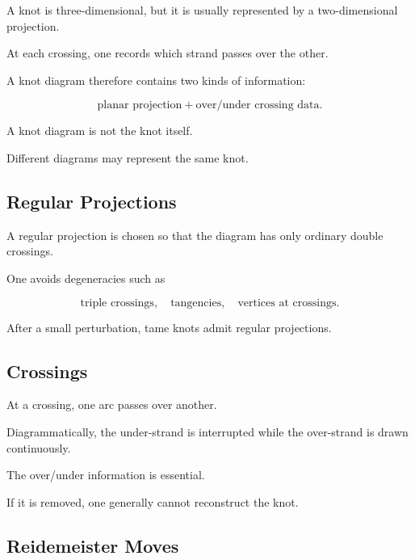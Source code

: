 A knot is three-dimensional, but it is usually represented by a
two-dimensional projection.

At each crossing, one records which strand passes over the other.

A knot diagram therefore contains two kinds of information:

\[
\boxed{
\text{planar projection}
+
\text{over/under crossing data}.
}
\]

\begin{warningbox}
A knot diagram is not the knot itself.

Different diagrams may represent the same knot.
\end{warningbox}

\subsection{Regular Projections}
\label{subsec:regular-knot-projections}

A regular projection is chosen so that the diagram has only ordinary double
crossings.

One avoids degeneracies such as

\[
\boxed{
\text{triple crossings},
\quad
\text{tangencies},
\quad
\text{vertices at crossings}.
}
\]

After a small perturbation, tame knots admit regular projections.

\subsection{Crossings}
\label{subsec:knot-crossings}

At a crossing, one arc passes over another.

Diagrammatically, the under-strand is interrupted while the over-strand is
drawn continuously.

The over/under information is essential.

If it is removed, one generally cannot reconstruct the knot.

\subsection{Reidemeister Moves}
\label{subsec:reidemeister-moves}

